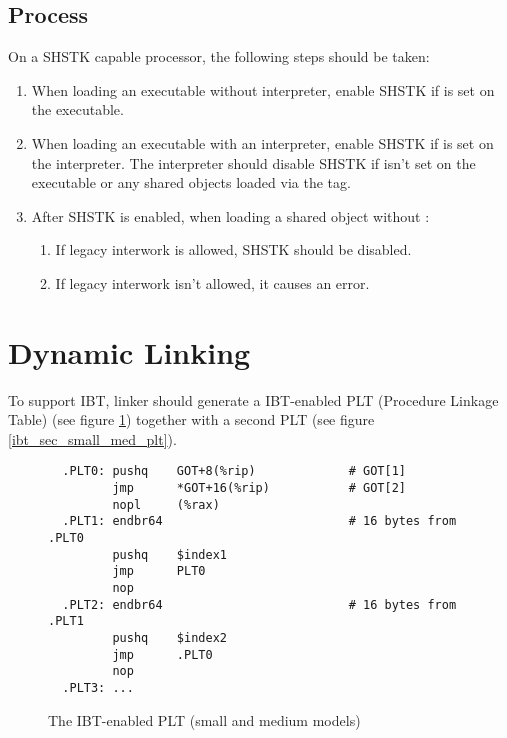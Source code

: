 \subsection{Process }
\label{shstk}

On a SHSTK capable processor, the following steps should be taken:

\begin{enumerate}
  \item
    \begin{sloppypar}
      When loading an executable without interpreter, enable SHSTK if
       is set on the executable.
    \end{sloppypar}
  \item
    \begin{sloppypar}
      When loading an executable with an interpreter, enable SHSTK if
       is set on the interpreter.
      The interpreter should disable SHSTK if
       isn't set on the executable
      or any shared objects loaded via the  tag.
    \end{sloppypar}
  \item
    \begin{sloppypar}
      After SHSTK is enabled, when loading a shared object without
      :
    \end{sloppypar}
    \begin{enumerate}
      \item If legacy interwork is allowed, SHSTK should be disabled.
      \item If legacy interwork isn't allowed, it causes an error.
    \end{enumerate}
\end{enumerate}

\section{Dynamic Linking}

To support IBT, linker should generate a IBT-enabled PLT (Procedure
Linkage Table) (see figure \ref{ibt_small_med_plt}) together with a second
PLT (see figure \ref{ibt_sec_small_med_plt}).

\begin{figure}[H]
\Hrule
\caption{The IBT-enabled PLT (small and medium models)}
\label{ibt_small_med_plt}
\begin{footnotesize}
\begin{verbatim}
  .PLT0: pushq    GOT+8(%rip)             # GOT[1]
         jmp      *GOT+16(%rip)           # GOT[2]
         nopl     (%rax)
  .PLT1: endbr64                          # 16 bytes from .PLT0
         pushq    $index1
         jmp      PLT0
         nop
  .PLT2: endbr64                          # 16 bytes from .PLT1
         pushq    $index2
         jmp      .PLT0
         nop
  .PLT3: ...
\end{verbatim}%
\end{footnotesize}
\Hrule
\end{figure}

